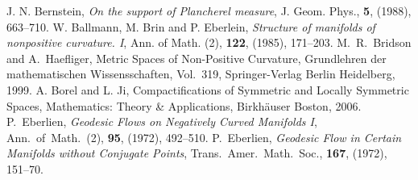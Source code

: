  J. N. Bernstein, \textit{On the support of Plancherel measure}, J. Geom. Phys., \textbf{5}, (1988), 663--710.
 W. Ballmann, M. Brin and P. Eberlein, \textit{Structure of manifolds of nonpositive curvature. I}, Ann. of Math. (2),  \textbf{122}, (1985), 171--203.
 M.~R.~Bridson and A.~Haefliger, Metric Spaces of Non-Positive Curvature, Grundlehren der mathematischen Wissensschaften, Vol.~319, Springer-Verlag Berlin Heidelberg, 1999.
 A. Borel and L. Ji, Compactifications of Symmetric and Locally Symmetric Spaces, Mathematics: Theory \& Applications,  Birkhäuser  Boston, 2006.
 P.~Eberlien, \textit{Geodesic Flows on Negatively Curved Manifolds I}, Ann.~of~Math.~(2), \textbf{95}, (1972), 492--510.
 P.~Eberlien, \textit{Geodesic Flow in Certain Manifolds without Conjugate Points}, Trans.~Amer.~Math.~Soc., \textbf{167}, (1972), 151--70.
